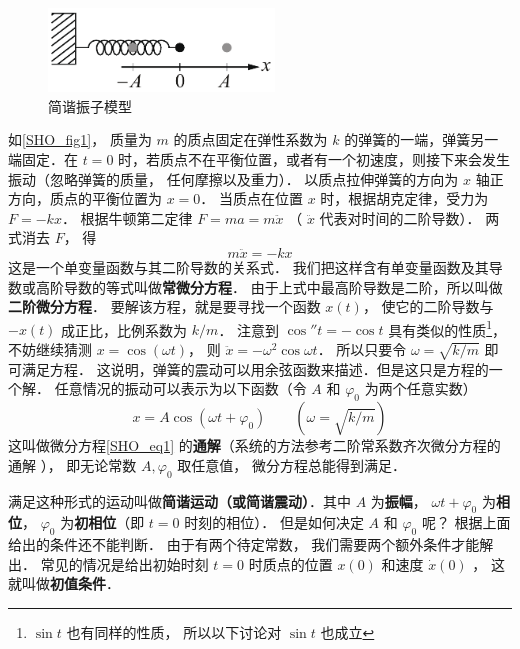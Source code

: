 

\begin{figure}[h]
\centering
\includegraphics[width=6cm]{./figures/SHO.pdf}
\caption{简谐振子模型} \label{SHO_fig1}
\end{figure}

如\autoref{SHO_fig1}， 质量为 $m$ 的质点固定在弹性系数为 $k$ 的弹簧的一端，弹簧另一端固定．在 $t = 0$ 时，若质点不在平衡位置，或者有一个初速度，则接下来会发生振动（忽略弹簧的质量， 任何摩擦以及重力）． 以质点拉伸弹簧的方向为 $x$ 轴正方向，质点的平衡位置为 $x = 0$． 当质点在位置 $x$ 时，根据胡克定律，受力为 $F =  - kx$． 根据牛顿第二定律 $F = ma = m\ddot x$ （ $\ddot x$ 代表对时间的二阶导数）．  两式消去 $F$， 得
\begin{equation}\label{SHO_eq1}
m\ddot x =  - kx
\end{equation}
这是一个单变量函数与其二阶导数的关系式． 我们把这样含有单变量函数及其导数或高阶导数的等式叫做\textbf{常微分方程}． 由于上式中最高阶导数是二阶，所以叫做\textbf{二阶微分方程}． 要解该方程，就是要寻找一个函数 $x(t)$， 使它的二阶导数与 $- x(t)$ 成正比，比例系数为 $k/m$． 注意到 $\cos'' t =  - \cos t$ 具有类似的性质\footnote{$\sin t$ 也有同样的性质， 所以以下讨论对 $\sin t$ 也成立}，不妨继续猜测 $x = \cos(\omega t)$， 则 $\ddot x =  - {\omega ^2}\cos \omega t$． 所以只要令 $\omega = \sqrt {{k}/{m}}$ 即可满足方程． 这说明，弹簧的震动可以用余弦函数来描述．但是这只是方程的一个解． 任意情况的振动可以表示为以下函数（令 $A$ 和 $\varphi_0$ 为两个任意实数）
\begin{equation}\label{SHO_eq2}
x = A\cos \left( {\omega t + {\varphi _0}} \right)  \qquad (\omega  = \sqrt {k/m})
\end{equation}
这叫做微分方程\autoref{SHO_eq1} 的\textbf{通解}（系统的方法参考二阶常系数齐次微分方程的通解
）， 即无论常数 $A, \varphi_0$ 取任意值， 微分方程总能得到满足．

满足这种形式的运动叫做\textbf{简谐运动（或简谐震动）}．其中 $A$ 为\textbf{振幅}， $\omega t + {\varphi _0}$ 为\textbf{相位}， ${\varphi _0}$ 为\textbf{初相位}（即 $t = 0$ 时刻的相位）． 但是如何决定 $A$ 和 ${\varphi _0}$ 呢？ 根据上面给出的条件还不能判断． 由于有两个待定常数， 我们需要两个额外条件才能解出． 常见的情况是给出初始时刻 $t = 0$ 时质点的位置 $x(0)$ 和速度 $\dot x(0)$ ， 这就叫做\textbf{初值条件}．

